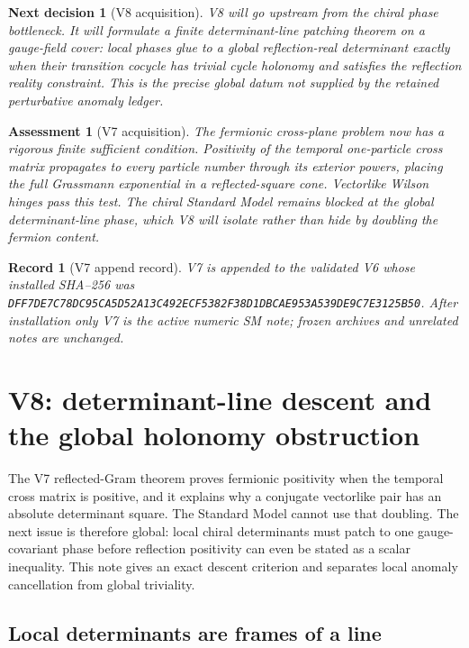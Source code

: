 \documentclass[11pt]{article}
\newtheorem{decision}[theorem]{Next decision}
\newtheorem{assessment}[theorem]{Assessment}
\newtheorem{record}[theorem]{Record}
\theoremstyle{remark}
\begin{document}
\begin{decision}[V8 acquisition]
\label{dec:v19v7-next}
V8 will go upstream from the chiral phase bottleneck.  It will formulate a
finite determinant-line patching theorem on a gauge-field cover: local
phases glue to a global reflection-real determinant exactly when their
transition cocycle has trivial cycle holonomy and satisfies the reflection
reality constraint.  This is the precise global datum not supplied by the
retained perturbative anomaly ledger.
\end{decision}

\begin{assessment}[V7 acquisition]
\label{ass:v19v7}
The fermionic cross-plane problem now has a rigorous finite sufficient
condition.  Positivity of the temporal one-particle cross matrix propagates
to every particle number through its exterior powers, placing the full
Grassmann exponential in a reflected-square cone.  Vectorlike Wilson
hinges pass this test.  The chiral Standard Model remains blocked at the
global determinant-line phase, which V8 will isolate rather than hide by
doubling the fermion content.
\end{assessment}

\begin{record}[V7 append record]
\label{rec:v19v7}
V7 is appended to the validated V6 whose installed SHA--256 was
\texttt{DFF7DE7C78DC95CA5D52A13C492ECF5382F38D1DBCAE953A539DE9C7E3125B50}.
After installation only V7 is the active numeric SM note; frozen archives
and unrelated notes are unchanged.
\end{record}




\section{V8: determinant-line descent and the global holonomy obstruction}
\label{sec:v19v8}

The V7 reflected-Gram theorem proves fermionic positivity when the temporal
cross matrix is positive, and it explains why a conjugate vectorlike pair
has an absolute determinant square.  The Standard Model cannot use that
doubling.  The next issue is therefore global: local chiral determinants
must patch to one gauge-covariant phase before reflection positivity can
even be stated as a scalar inequality.  This note gives an exact descent
criterion and separates local anomaly cancellation from global
triviality.

\subsection{Local determinants are frames of a line}
\end{document}
